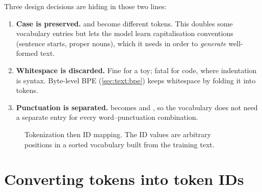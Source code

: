Three design decisions are hiding in those two lines:
\begin{enumerate}
  \item \textbf{Case is preserved.}  and  become different tokens. This
  doubles some vocabulary entries but lets the model learn capitalisation conventions (sentence
  starts, proper nouns), which it needs in order to \emph{generate} well-formed text.
  \item \textbf{Whitespace is discarded.} Fine for a toy; fatal for code, where indentation is
  syntax. Byte-level BPE (\cref{sec:text:bpe}) keeps whitespace by folding it into tokens.
  \item \textbf{Punctuation is separated.}  becomes  and \code{,}, so the
  vocabulary does not need a separate entry for every word--punctuation combination.
\end{enumerate}

\begin{figure}[t]
\centering
{}
\caption{Tokenization then ID mapping. The ID values are arbitrary positions in a sorted vocabulary
built from the training text.}
\label{fig:text:tokids}
\end{figure}

\section{Converting tokens into token IDs}\label{sec:text:ids}

